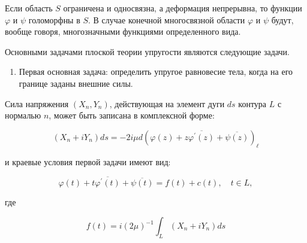\documentclass[10pt]{article}
\begin{document}
Если область $S$ ограничена и односвязна, а деформация непрерывна, то функции $\varphi$ и $\psi$ голоморфны в $S$. В случае конечной многосвязной области $\varphi$ и $\psi$ будут, вообще говоря, многозначными функциями определенного вида.



Основными задачами плоской теории упругости являются следующие задачи.



\begin{enumerate}

  \item Первая основная задача: определить упругое равновесие тела, когда на его границе заданы внешние силы.

\end{enumerate}



Сила напряжения $\left(X_{n}, Y_{n}\right)$, действующая на элемент дуги $d s$ контура $L$ с нормалью $n$, может быть записана в комплексной форме:



\[

\left(X_{n}+i Y_{n}\right) d s=-2 i \mu d\left(\varphi(z)+z \overline{\varphi^{\prime}(z)}+\overline{\psi(z)}\right)_{\ell}

\]



и краевые условия первой задачи имеют вид:



\[

\varphi(t)+t \overline{\varphi^{\prime}(t)}+\overline{\psi(t)}=f(t)+c(t), \quad t \in L,

\]



где



\[

f(t)=i(2 \mu)^{-1} \int_{L}\left(X_{n}+i Y_{n}\right) d s

\]
\end{document}
